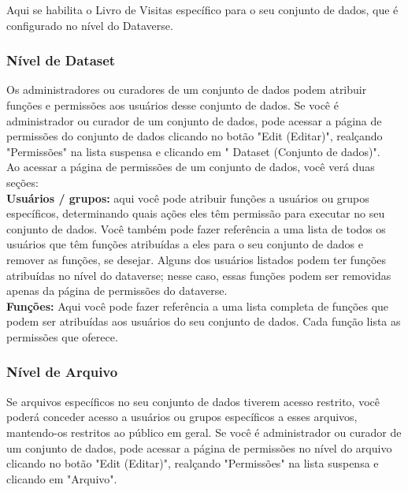 \documentclass[12pt,hidelinks]{article}
\begin{document}
\qquad Aqui se habilita o Livro de Visitas específico para o seu conjunto de dados, que é configurado no nível do Dataverse.

        \subsubsection{Nível de Dataset}
        
\qquad Os administradores ou curadores de um conjunto de dados podem atribuir funções e permissões aos usuários desse conjunto de dados. Se você é administrador ou curador de um conjunto de dados, pode acessar a página de permissões do conjunto de dados clicando no botão "Edit (Editar)", realçando "Permissões" na lista suspensa e clicando em " Dataset (Conjunto de dados)".\\

Ao acessar a página de permissões de um conjunto de dados, você verá duas seções:\\

\textbf{Usuários / grupos:} aqui você pode atribuir funções a usuários ou grupos específicos, determinando quais ações eles têm permissão para executar no seu conjunto de dados. Você também pode fazer referência a uma lista de todos os usuários que têm funções atribuídas a eles para o seu conjunto de dados e remover as funções, se desejar. Alguns dos usuários listados podem ter funções atribuídas no nível do dataverse; nesse caso, essas funções podem ser removidas apenas da página de permissões do dataverse.\\

\textbf{Funções:} Aqui você pode fazer referência a uma lista completa de funções que podem ser atribuídas aos usuários do seu conjunto de dados. Cada função lista as permissões que oferece.
        
        \subsubsection{Nível de Arquivo}
        
\qquad Se arquivos específicos no seu conjunto de dados tiverem acesso restrito, você \\poderá conceder acesso a usuários ou grupos específicos a esses arquivos, mantendo-os restritos ao público em geral. Se você é administrador ou curador de um conjunto de dados, pode acessar a página de permissões no nível do arquivo clicando no botão "Edit (Editar)", realçando "Permissões" na lista suspensa e clicando em "Arquivo".
\end{document}
